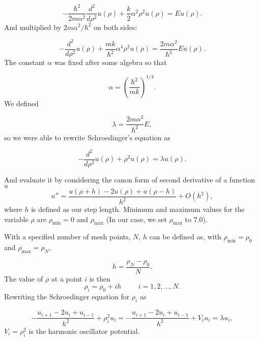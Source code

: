 \documentclass[10pt,showpacs,preprintnumbers,footinbib,amsmath,amssymb,aps,prl,twocolumn,groupedaddress,superscriptaddress,showkeys]{revtex4-1}
\begin{document}
\begin{equation*}
	-\frac{\hbar^2}{2 m \alpha^2} \frac{d^2}{d\rho^2} u(\rho) 
	+ \frac{k}{2} \alpha^2\rho^2u(\rho)  = E u(\rho) .
\end{equation*}
And multiplied by $2m\alpha^2/\hbar^2$ on both sides:

\begin{equation*}
	-\frac{d^2}{d\rho^2} u(\rho) 
	+ \frac{mk}{\hbar^2} \alpha^4\rho^2u(\rho)  = \frac{2m\alpha^2}{\hbar^2}E u(\rho) .
\end{equation*}
The constant $\alpha$ was fixed after some algebra
so that


\begin{equation*}
	\alpha = \left(\frac{\hbar^2}{mk}\right)^{1/4}.
\end{equation*}
We defined

\begin{equation*}
	\lambda = \frac{2m\alpha^2}{\hbar^2}E,
\end{equation*}
so we were able to rewrite Schroedinger's equation as

\begin{equation*}
	-\frac{d^2}{d\rho^2} u(\rho) + \rho^2u(\rho)  = \lambda u(\rho) .
\end{equation*}

And evaluate it by considering the canon form of second derivative of a function $u$
\begin{equation}
	u''=\frac{u(\rho+h) -2u(\rho) +u(\rho-h)}{h^2} +O(h^2),
	\label{eq:diffoperation}
\end{equation}
where $h$ is defined as our step length.
Minimum and maximum values for the variable $\rho$ are
$\rho_{\mathrm{min}}=0$  and $\rho_{\mathrm{max}}$
(In our case, we set $\rho_{\mathrm{max}}$ to 7.0).

With a specified number of mesh points, $N$, 
$h$ can be defined as, with $\rho_{\mathrm{min}}=\rho_0$  and $\rho_{\mathrm{max}}=\rho_N$,

\begin{equation*}
	h=\frac{\rho_N-\rho_0 }{N}.
\end{equation*}
The value of $\rho$ at a point $i$ is then 
\[
\rho_i= \rho_0 + ih \hspace{1cm} i=1,2,\dots , N.
\]
Rewriting the Schroedinger equation for $\rho_i$ as

\[
-\frac{u_{i+1} -2u_i +u_{i-1}}{h^2}+\rho_i^2u_i=-\frac{u_{i+1} -2u_i +u_{i-1} }{h^2}+V_iu_i  = \lambda u_i,
\]
$V_i=\rho_i^2$ is the harmonic oscillator potential.
\end{document}

